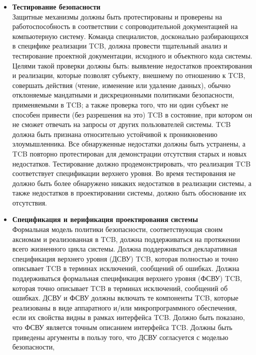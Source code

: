 \begin{enumerate}
\begin{enumerate}
\begin{enumerate}
\begin{enumerate}
\begin{itemize}
                    \item{\textbf{Тестирование безопасности}}\\
                    Защитные механизмы должны быть протестированы и проверены на работоспособность в соответствии с сопроводительной документацией на компьютерную систему.  Команда специалистов,
                    досконально разбирающихся в специфике реализации TCB, должна провести тщательный анализ и тестирование проектной документации, исходного и объектного кода системы. Целями такой
                    проверки должны быть: выявление недостатков проектирования и реализации, которые позволят субъекту, внешнему по отношению к TCB, совершать действия (чтение, изменение или удаление данных),
                    обычно отклоняемые мандатными и дискреционными политиками безопасности, применяемыми в TCB; а также проверка того, что ни один субъект не способен привести (без разрешения на это)
                    TCB в состояние, при котором он не сможет отвечать на запросы от других пользователей системы. TCB должна быть признана относительно устойчивой к проникновению злоумышленника.
                    Все обнаруженные недостатки должны быть устранены, а TCB повторно протестирован для демонстрации отсутствия старых и новых недостатков. Тестирование должно продемонстрировать,
                    что реализация TCB соответствует спецификации верхнего уровня. Во время тестирования не должно быть более обнаружено никаких недостатков в реализации системы, а также недостатков
                    в проектировании системы, должно быть обоснование их отсутствия.
                    \item{\textbf{Спецификация и верификация проектирования системы}}\\
                    Формальная модель политики безопасности, соответствующая своим аксиомам и реализованная в TCB, должна поддерживаться на протяжении всего жизненного цикла системы.
                    Должна поддерживаться декларативная спецификация верхнего уровня (ДСВУ) TCB, которая полностью и точно описывает TCB в терминах исключений, сообщений об ошибках.
                    Должна поддерживаться формальная спецификация верхнего уровня (ФСВУ) TCB, которая точно описывает	 TCB в терминах исключений, сообщений об ошибках.
                    ДСВУ и ФСВУ должны включать те компоненты TCB, которые реализованы в виде аппаратного и/или микропрограммного обеспечения, если их свойства видны в рамках интерфейса TCB.
                    Должно быть показано, что ФСВУ является точным описанием интерфейса TCB. Должны быть приведены аргументы в пользу того, что ДСВУ согласуется с моделью безопасности,

\end{itemize}
\end{enumerate}
\end{enumerate}
\end{enumerate}
\end{enumerate}
